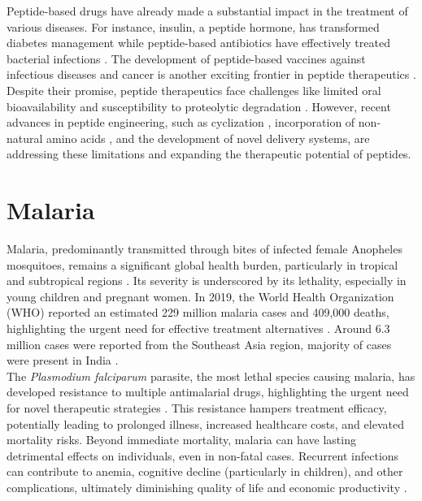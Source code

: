 Peptide-based drugs have already made a substantial impact in the treatment of various diseases. For
instance, insulin, a peptide hormone, has transformed diabetes management while peptide-based
antibiotics have effectively treated bacterial infections \cite{cesar2023adv}. The development of
peptide-based vaccines against infectious diseases and cancer is another exciting frontier in
peptide therapeutics \cite{purcell2007vaccine}. \\

Despite their promise, peptide therapeutics face challenges like limited oral bioavailability and
susceptibility to proteolytic degradation \cite{muttenthaler2021trends}. However, recent advances in
peptide engineering, such as cyclization \cite{hayes2021cycl}, incorporation of non-natural amino
acids \cite{li2022nonnat}, and the development of novel delivery systems, are addressing these
limitations and expanding the therapeutic potential of peptides.

\section{Malaria} 
Malaria, predominantly transmitted through bites of infected female Anopheles mosquitoes, remains a
significant global health burden, particularly in tropical and subtropical regions
\cite{duguma2022ethiopia, ghosh2021malaria}. Its severity is underscored by its lethality,
especially in young children and pregnant women. In 2019, the World Health Organization (WHO)
reported an estimated 229 million malaria cases and 409,000 deaths, highlighting the urgent need for
effective treatment alternatives \cite{jain2022pregnancy}. Around 6.3 million cases were reported
from the Southeast Asia region, majority of cases were present in India
\cite{cristina2020pregnancy}. \\

The \textit{Plasmodium falciparum} parasite, the most lethal species causing malaria, has developed
resistance to multiple antimalarial drugs, highlighting the urgent need for novel therapeutic
strategies \cite{fairhurst2012artemisinin}. This resistance hampers treatment
efficacy, potentially leading to prolonged illness, increased healthcare costs, and elevated
mortality risks. Beyond immediate mortality, malaria can have lasting detrimental effects on
individuals, even in non-fatal cases. Recurrent infections can contribute to anemia, cognitive
decline (particularly in children), and other complications, ultimately diminishing quality of life
and economic productivity \cite{shukla2022super}.
\\


